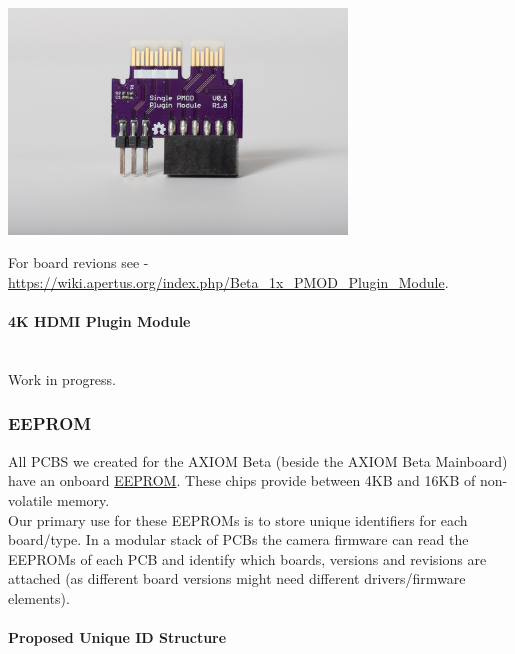 \begin{center}
\includegraphics[height=6cm]{images/1xpmodtop}
\end{center}


For board revions see - \href{https://wiki.apertus.org/index.php/Beta_1x_PMOD_Plugin_Module}{https://wiki.apertus.org/index.php/Beta\_1x\_PMOD\_Plugin\_Module}.\\



\paragraph{4K HDMI Plugin Module}\mbox{}\\

Work in progress.

\subsubsection{EEPROM}

All PCBS we created for the AXIOM Beta (beside the AXIOM Beta Mainboard) have an onboard \href{https://en.wikipedia.org/wiki/EEPROM}{EEPROM}. These chips provide between 4KB and 16KB of non-volatile memory.\\

Our primary use for these EEPROMs is to store unique identifiers for each board/type. In a modular stack of PCBs the camera firmware can read the EEPROMs of each PCB and identify which boards, versions and revisions are attached (as different board versions might need different drivers/firmware elements).\\

\paragraph{Proposed Unique ID Structure}\mbox{}\\

